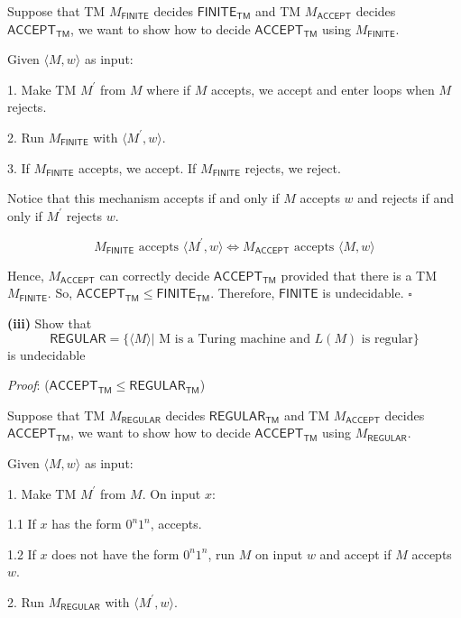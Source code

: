 \documentclass[a4paper, 11pt]{article}
\renewcommand{\part}[1] {\vspace{.10in} {\bf (#1)}}
\begin{document}
	Suppose that TM $M_{\textsf{FINITE}}$ decides $\textsf{FINITE}_{\textsf{TM}}$ and TM $M_{\textsf{ACCEPT}}$ decides $\textsf{ACCEPT}_{\textsf{TM}}$, we want to show how to decide $\textsf{ACCEPT}_{\textsf{TM}}$ using $M_{\textsf{FINITE}}$.
	
	Given $\langle M, w \rangle$ as input:
	
	1. Make TM $M^\prime$ from $M$ where if $M$ accepts, we accept and enter loops when $M$ rejects.
	
	2. Run $M_{\textsf{FINITE}}$ with $\langle M^\prime, w \rangle$.
	
	3. If $M_{\textsf{FINITE}}$ accepts, we accept. If $M_{\textsf{FINITE}}$ rejects, we reject.
	
	Notice that this mechanism accepts if and only if $M$ accepts $w$ and rejects if and only if $M^\prime$ rejects $w$. 
	
	$$ M_{\textsf{FINITE}} \text{ accepts }\langle M^\prime,w \rangle \iff M_{\textsf{ACCEPT}} \text{ accepts } \langle M,w\rangle $$
	
	Hence, $M_{\textsf{ACCEPT}}$ can correctly decide $\textsf{ACCEPT}_{\textsf{TM}}$ provided that there is a TM $M_{\textsf{FINITE}}$. So, $\textsf{ACCEPT}_{\textsf{TM}} \leq \textsf{FINITE}_{\textsf{TM}} $. Therefore, $\textsf{FINITE}$ is undecidable. $\square$

	\part{iii} Show that 
	$$ \textsf{REGULAR} = \{\langle M \rangle | \text{ M is a Turing machine and $L(M)$ is regular} \} $$ is undecidable


	{\em Proof}: ($\textsf{ACCEPT}_{\textsf{TM}} \leq \textsf{REGULAR}_{\textsf{TM}} $)

	Suppose that TM $M_{\textsf{REGULAR}}$ decides $\textsf{REGULAR}_{\textsf{TM}}$ and TM $M_{\textsf{ACCEPT}}$ decides $\textsf{ACCEPT}_{\textsf{TM}}$, we want to show how to decide $\textsf{ACCEPT}_{\textsf{TM}}$ using $M_{\textsf{REGULAR}}$.
	
	Given $\langle M, w \rangle$ as input:
	
	1. Make TM $M^\prime$ from $M$. On input $x$:
	
	1.1 If $x$ has the form $0^n1^n$, accepts.
	
	1.2 If $x$ does not have the form $0^n1^n$, run $M$ on input $w$ and accept if $M$ accepts $w$.
	
	2. Run $M_{\textsf{REGULAR}}$ with $\langle M^\prime, w \rangle$.
	
\end{document}
